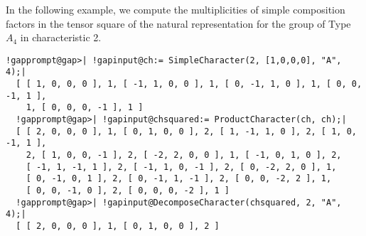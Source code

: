 \documentclass[a4paper,11pt]{report}
\begin{document}
{{{ In the following example, we compute the multiplicities of simple composition
factors in the tensor square of the natural representation for the group of
Type $A_4$ in characteristic 2. 
\begin{Verbatim}[commandchars=!@|,fontsize=\small,frame=single,label=Example]
  !gapprompt@gap>| !gapinput@ch:= SimpleCharacter(2, [1,0,0,0], "A", 4);|
  [ [ 1, 0, 0, 0 ], 1, [ -1, 1, 0, 0 ], 1, [ 0, -1, 1, 0 ], 1, [ 0, 0, -1, 1 ], 
    1, [ 0, 0, 0, -1 ], 1 ]
  !gapprompt@gap>| !gapinput@chsquared:= ProductCharacter(ch, ch);|
  [ [ 2, 0, 0, 0 ], 1, [ 0, 1, 0, 0 ], 2, [ 1, -1, 1, 0 ], 2, [ 1, 0, -1, 1 ], 
    2, [ 1, 0, 0, -1 ], 2, [ -2, 2, 0, 0 ], 1, [ -1, 0, 1, 0 ], 2, 
    [ -1, 1, -1, 1 ], 2, [ -1, 1, 0, -1 ], 2, [ 0, -2, 2, 0 ], 1, 
    [ 0, -1, 0, 1 ], 2, [ 0, -1, 1, -1 ], 2, [ 0, 0, -2, 2 ], 1, 
    [ 0, 0, -1, 0 ], 2, [ 0, 0, 0, -2 ], 1 ]
  !gapprompt@gap>| !gapinput@DecomposeCharacter(chsquared, 2, "A", 4);|
  [ [ 2, 0, 0, 0 ], 1, [ 0, 1, 0, 0 ], 2 ]
\end{Verbatim}
 }

 }

 }

 
\end{document}
